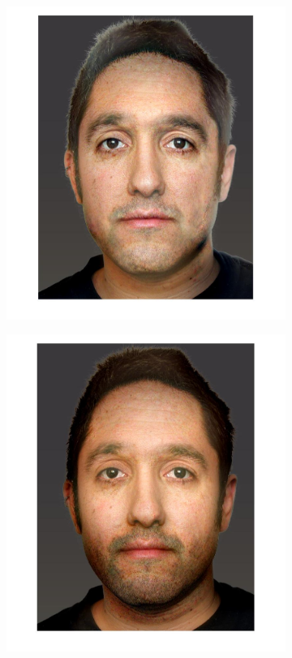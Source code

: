 \documentclass[a4paper]{iacas}
\begin{document}
\begin{figure}[!htbp]
\begin{subfigure}[b]{0.32\textwidth}
		\includegraphics[width=\textwidth]{image_61_9.jpg}
		\caption{}
		\label{fig:i_61_9}
	\end{subfigure}
	\begin{subfigure}[b]{0.32\textwidth}
		\includegraphics[width=\textwidth]{image_61_10.jpg}
		\caption{}
		\label{fig:i_61_10}
	\end{subfigure}
	

\end{figure}
\end{document}
